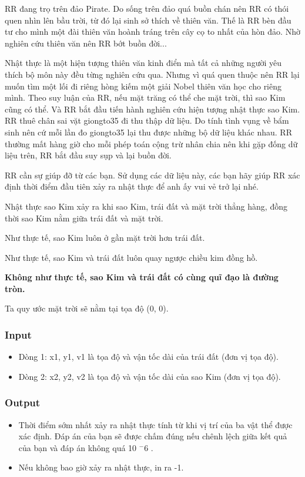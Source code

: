 



   RR đang trọ trên đảo Pirate. Do sống trên đảo quá buồn chán nên RR có thói quen nhìn lên bầu trời, từ đó lại sinh sở thích về thiên văn. Thế là RR bèn đầu tư cho mình một đài thiên văn hoành tráng trên cây cọ to nhất của hòn đảo. Nhờ nghiên cứu thiên văn nên RR bớt buồn đời...  

   Nhật thực là một hiện tượng thiên văn kinh điển mà tất cả những người yêu thích bộ môn này đều từng nghiên cứu qua. Nhưng vì quá quen thuộc nên RR lại muốn tìm một lối đi riêng hòng kiếm một giải Nobel thiên văn học cho riêng mình. Theo suy luận của RR, nếu mặt trăng có thể che mặt trời, thì sao Kim cũng có thể. Và RR bắt đầu tiến hành nghiên cứu hiện tượng nhật thực sao Kim. RR thuê chân sai vặt giongto35 đi thu thập dữ liệu. Do tính tình vụng về bẩm sinh nên cứ mỗi lần đo giongto35 lại thu được những bộ dữ liệu khác nhau. RR thường mất hàng giờ cho mỗi phép toán cộng trừ nhân chia nên khi gặp đống dữ liệu trên, RR bắt đầu suy sụp và lại buồn đời.  

   RR cần sự giúp đỡ từ các bạn. Sử dụng các dữ liệu này, các bạn hãy giúp RR xác định thời điểm đầu tiên xảy ra nhật thực để anh ấy vui vẻ trở lại nhé.  

   Nhật thực sao Kim xảy ra khi sao Kim, trái đất và mặt trời thẳng hàng, đồng thời sao Kim nằm giữa trái đất và mặt trời.  

   Như thực tế, sao Kim luôn ở gần mặt trời hơn trái đất.  

   Như thực tế, sao Kim và trái đất luôn quay ngược chiều kim đồng hồ.  

\textbf{    Không như thực tế, sao Kim và trái đất có cùng quĩ đạo là đường tròn.   }

   Ta quy ước mặt trời sẽ nằm tại tọa độ (0, 0).  

\subsubsection{   Input  }
\begin{itemize}
	\item     Dòng 1: x1, y1, v1 là tọa độ và vận tốc dài của trái đất (đơn vị tọa độ).   
	\item      Dòng 2: x2, y2, v2 là tọa độ và vận tốc dài của sao Kim (đơn vị tọa độ).    
\end{itemize}

\subsubsection{   Output  }
\begin{itemize}
	\item     Thời điểm sớm nhất xảy ra nhật thực tính từ khi vị trí của ba vật thể được xác định. Đáp án của bạn sẽ được chấm đúng nếu chênh lệch giữa kết quả của bạn và đáp án không quá 10    $^     -6    $    .   
	\item     Nếu không bao giờ xảy ra nhật thực, in ra -1.   
\end{itemize}

